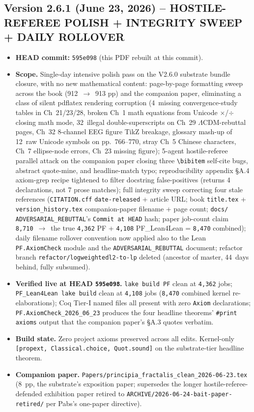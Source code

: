 \subsection*{Version 2.6.1 (June 23, 2026) -- HOSTILE-REFEREE POLISH + INTEGRITY SWEEP + DAILY ROLLOVER}
\begin{itemize}
\item \textbf{HEAD commit:} \texttt{595e098} (this PDF rebuilt at this commit).
\item \textbf{Scope.} Single-day intensive polish pass on the V2.6.0 substrate
bundle closure, with no new mathematical content: page-by-page
formatting sweep across the book (912~$\to$~913 pp) and the
companion paper, eliminating a class of silent pdflatex rendering
corruption (4~missing convergence-study tables in Ch~21/23/28,
broken Ch~1 math equations from Unicode \texttt{$\times$}/\texttt{$\div$}
closing math mode, 32~illegal double-superscripts on Ch~29
$\Lambda$CDM-rebuttal pages, Ch~32 8-channel EEG figure TikZ
breakage, glossary mash-up of 12~raw Unicode symbols on
pp.~766--770, stray Ch~5 Chinese characters, Ch~7 ellipse-node
errors, Ch~23 missing figure); 5-agent hostile-referee parallel
attack on the companion paper closing three \texttt{\textbackslash bibitem}
self-cite bugs, abstract quote-mine, and headline-match typo;
reproducibility appendix \S A.4 axiom-grep recipe tightened to
filter docstring false-positives (returns 4 declarations, not 7
prose matches); full integrity sweep correcting four stale
references (\texttt{CITATION.cff} \texttt{date-released} + article
URL; book \texttt{title.tex} + \texttt{version\_history.tex}
companion-paper filename + page count; \texttt{docs/}
\texttt{ADVERSARIAL\_REBUTTAL}'s \texttt{Commit at HEAD} hash; paper
job-count claim \texttt{8,710}~$\to$~the true \texttt{4,362} PF +
\texttt{4,108} PF\_Lean4Lean = \texttt{8,470} combined); daily
filename rollover convention now applied also to the Lean
\texttt{PF.AxiomCheck} module and the \texttt{ADVERSARIAL\_REBUTTAL}
document; refactor branch \texttt{refactor/logweightedl2-to-lp}
deleted (ancestor of master, 44~days behind, fully subsumed).
\item \textbf{Verified live at HEAD \texttt{595e098}.}
\texttt{lake build PF} clean at \texttt{4{,}362} jobs;
\texttt{PF\_Lean4Lean lake build} clean at \texttt{4{,}108} jobs
(\texttt{8{,}470} combined kernel re-elaborations); Coq Tier-I
named files all present with zero \texttt{Axiom} declarations;
\texttt{PF.AxiomCheck\_2026\_06\_23} produces the four headline
theorems' \texttt{\#print axioms} output that the companion paper's
\S A.3 quotes verbatim.
\item \textbf{Build state.} Zero project axioms preserved across all
edits. Kernel-only \texttt{[propext, Classical.choice, Quot.sound]}
on the substrate-tier headline theorem.
\item \textbf{Companion paper.}
\texttt{Papers/principia\_fractalis\_clean\_2026-06-23.tex}
(8~pp, the substrate's exposition paper; supersedes the longer
hostile-referee-defended exhibition paper retired to
\texttt{ARCHIVE/2026-06-24-bait-paper-retired/} per Pabs's
one-paper directive).
\end{itemize}

